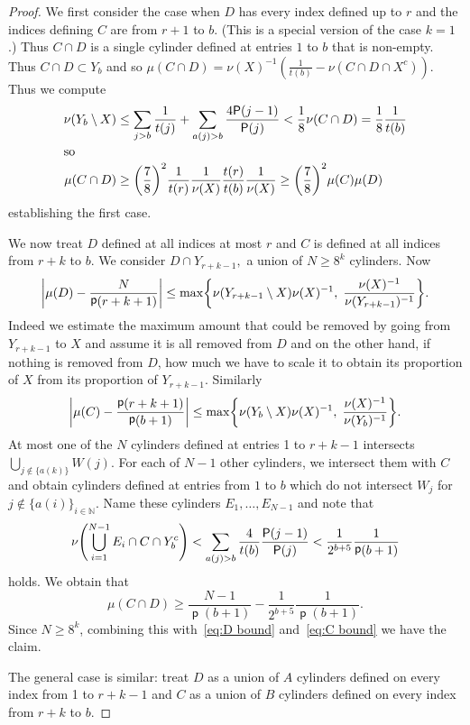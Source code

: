 \documentclass[10pt]{amsart}
\theoremstyle{definition}\newtheorem{defi}[theo]{Definition}\newtheorem{rema}[theo]{Remark}\newtheorem{exam}[theo]{Example}\newtheorem{exem}[theo]{Example}\newtheorem{nota}[theo]{Notation}
\DeclareMathOperator{\p}{\mathsf{p}}
\newcommand{\N}{\mathbb{N}}
\renewcommand{\P}{\mathsf{P}}
\let\originalleft\left
\let\originalright\right
\renewcommand{\left}{\mathopen{}\mathclose\bgroup\originalleft}
\renewcommand{\right}{\aftergroup\egroup\originalright}
\begin{document}
\begin{proof}
We first consider the case when $D$ has every index defined up to $r$ and the indices defining $C$ are from $r+1$ to $b$. (This is a special version of the case $k=1$.) Thus $C \cap D$ is a single cylinder defined at entries $1$ to $b$ that is non-empty. Thus $ C \cap D \subset Y_b$ and so $\mu(C \cap D)=\nu(X)^{-1}(\frac 1 {t(b)} -\nu(C \cap D \cap X^c))$. Thus we compute
\begin{align*}
\nu(Y_b \setminus X) &\leq \sum_{j>b} \frac{1}{t(j)} + \sum_{a(j)>b} \frac{4\P(j-1)}{\P(j)}<\frac{1}{8} \nu(C \cap D) = \frac{1}{8} \frac {1}{t(b)}
\\
\intertext{so}
\mu(C\cap D) &\geq \left(\frac{7}{8} \right)^2 \frac{1}{t(r)} \frac{1}{\nu(X)} \frac{t(r)}{t(b)} \frac{1}{\nu(X)} \geq \left(\frac{7}{8}\right)^2\mu(C) \mu(D)
\end{align*}
establishing the first case.



We now treat $D$ defined at all indices at most $r$ and $C$ is defined at all indices from $r+k$ to $b$. We consider $D \cap Y_{r+k-1},$ a union of $N\geq 8^k $ cylinders. Now
\begin{equation}\label{eq:D bound}
\left| \mu(D)-\frac{N}{\p(r+k+1)} \right|
\leq
\max \left\{
\nu\left(Y_{r+k-1}\setminus X\right)\nu(X)^{-1},\;
\frac{\nu(X)^{-1}}{\nu(Y_{r+k-1})^{-1}}
\right\}.
\end{equation}
Indeed we estimate the maximum amount that could be removed by going from $Y_{r+k-1}$ to $X$ and assume it is all removed from $D$ and on the other hand, if nothing is removed from $D$, how much we have to scale it to obtain its proportion of $X$ from its proportion of $Y_{r+k-1}$. Similarly
\begin{equation}\label{eq:C bound}
\left| \mu(C)-\frac{\p(r+k+1)}{\p(b+1)} \right|
\leq
\max \left\{ \nu(Y_{b}\setminus X)\nu(X)^{-1},\; \frac{\nu(X)^{-1}}{\nu(Y_{b})^{-1}} \right\}.
\end{equation}
At most one of the $N$ cylinders defined at entries 1 to $r+k-1$ intersects $\bigcup_{j \notin \{a(k)\}}W(j)$. For each of $N-1$ other cylinders, we intersect them with $C$ and obtain cylinders defined at entries from $1$ to $b$ which do not intersect $W_j$ for $j \notin \{a(i)\}_{i \in \N}.$ Name these cylinders $E_1,\dots,E_{N-1}$ and note that
\[
\nu \left(\bigcup_{i=1}^{N-1}E_i \cap C \cap Y_b^c \right) <
\sum_{a(j)>b}\frac 4 {t(b)}\frac{\P(j-1)}{\P(j)}< \frac 1 {2^{b+5}}\frac 1 {\p(b+1)}
\]
holds. We obtain that
\[
\mu(C \cap D) \geq \frac{N-1}{\p(b+1)}-\frac{1}{2^{b+5}}\frac{1}{\p(b+1)}.
\]
Since $N\geq 8^k$, combining this with~\eqref{eq:D bound} and~\eqref{eq:C bound} we have the claim.

The general case is similar: treat $D$ as a union of $A$ cylinders defined on every index from 1 to $r+k-1$ and $C$ as a union of $B$ cylinders defined on every index from $r+k$ to $b$.
\end{proof}
\end{document}
